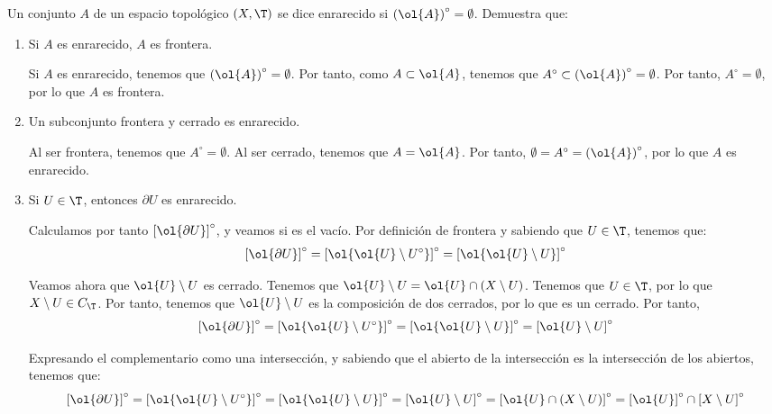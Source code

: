 \begin{ejercicio}
    Un conjunto $A$ de un espacio topológico $(X,\T)$ se dice enrarecido si $\left(\ol{A}\right)^\circ=\emptyset$. Demuestra que:
    \begin{enumerate}
        \item Si $A$ es enrarecido, $A$ es frontera.

        Si $A$ es enrarecido, tenemos que $\left(\ol{A}\right)^\circ=\emptyset$. Por tanto, como $A\subset \ol{A}$, tenemos que $A^\circ \subset \left(\ol{A}\right)^\circ = \emptyset$. Por tanto, $A^\circ =\emptyset$, por lo que $A$ es frontera.

        
        \item Un subconjunto frontera y cerrado es enrarecido.

        Al ser frontera, tenemos que $A^\circ = \emptyset$. Al ser cerrado, tenemos que $A=\ol{A}$. Por tanto, $\emptyset = A^\circ = \left(\ol{A}\right)^\circ$, por lo que $A$ es enrarecido.
        
        \item Si $U\in \T$, entonces $\partial U$ es enrarecido.

        Calculamos por tanto $\left[\ol{\partial U}\right]^\circ$, y veamos si es el vacío. Por definición de frontera y sabiendo que $U\in \T$, tenemos que:
        $$\left[\ol{\partial U}\right]^\circ
            = \left[\ol{\ol{U}\setminus U^\circ}\right]^\circ
            = \left[\ol{\ol{U}\setminus U}\right]^\circ$$

        Veamos ahora que ${\ol{U}\setminus U}$ es cerrado. Tenemos que ${\ol{U}\setminus U}=\ol{U}\cap (X\setminus U)$. Tenemos que $U\in \T$, por lo que $X\setminus U\in C_\T$. Por tanto, tenemos que ${\ol{U}\setminus U}$ es la composición de dos cerrados, por lo que es un cerrado. Por tanto, 
        $$\left[\ol{\partial U}\right]^\circ
            = \left[\ol{\ol{U}\setminus U^\circ}\right]^\circ
            = \left[\ol{\ol{U}\setminus U}\right]^\circ
            = \left[\ol{U}\setminus U\right]^\circ$$

        Expresando el complementario como una intersección, y sabiendo que el abierto de la intersección es la intersección de los abiertos, tenemos que:
        $$\left[\ol{\partial U}\right]^\circ
            = \left[\ol{\ol{U}\setminus U^\circ}\right]^\circ
            = \left[\ol{\ol{U}\setminus U}\right]^\circ
            = \left[\ol{U}\setminus U\right]^\circ
            = \left[\ol{U}\cap (X\setminus U)\right]^\circ
            = \left[\ol{U}\right]^\circ\cap \left[X\setminus U\right]^\circ
        $$


\end{enumerate}
\end{ejercicio}
